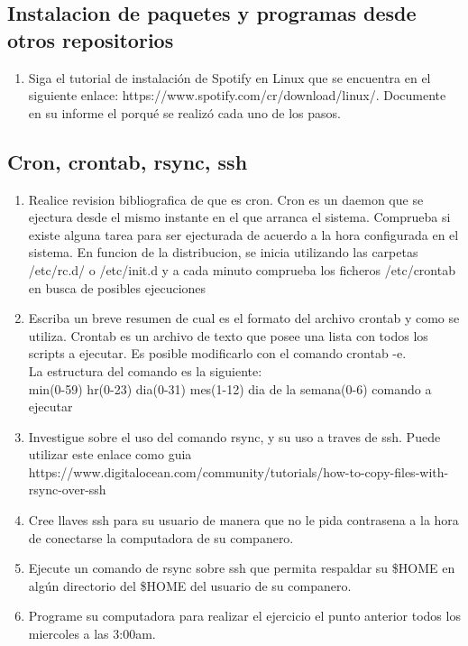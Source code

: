 \documentclass[11pt]{article}
\begin{document}
\subsection{Instalacion de paquetes y programas desde otros repositorios}
\begin{enumerate}
\item Siga el tutorial de instalación de Spotify en Linux que se encuentra en el siguiente enlace:
https://www.spotify.com/cr/download/linux/. Documente en su informe el porqué se
realizó cada uno de los pasos.

\end{enumerate}

\subsection{Cron, crontab, rsync, ssh}
\begin{enumerate}
\item Realice revision bibliografica de que es cron. Cron es un daemon que se ejectura desde el mismo instante en el que arranca el sistema. Comprueba si existe alguna tarea para ser ejecturada de acuerdo a la hora configurada en el sistema. En funcion de la distribucion, se inicia utilizando las carpetas /etc/rc.d/ o /etc/init.d y a cada minuto comprueba los ficheros /etc/crontab en busca de posibles ejecuciones \cite{Fulanito1999}
\item Escriba un breve resumen de cual es el formato del archivo crontab y como se utiliza. Crontab es un archivo de texto que posee una lista con todos los scripts a ejecutar. Es posible modificarlo con el comando crontab -e. \\
La estructura del comando es la siguiente: \\
min(0-59) hr(0-23) dia(0-31) mes(1-12) dia de la semana(0-6) comando a ejecutar
\item Investigue sobre el uso del comando rsync, y su uso a traves de ssh. Puede utilizar este enlace como guia https://www.digitalocean.com/community/tutorials/how-to-copy-files-with-rsync-over-ssh
\item Cree llaves ssh para su usuario de manera que no le pida contrasena a la hora de conectarse la computadora de su companero.
\item Ejecute un comando de rsync sobre ssh que permita respaldar su \$HOME en algún directorio del \$HOME del usuario de su companero.
\item Programe su computadora para realizar el ejercicio el punto anterior todos los miercoles a las 3:00am.
 
\end{enumerate}
\end{document}

